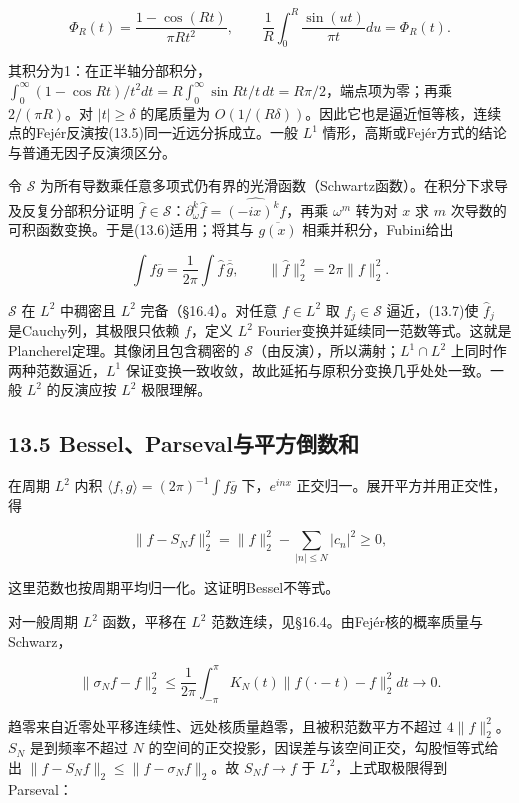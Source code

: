 \documentclass[11pt,a4paper]{article}
\begin{document}
\[
\Phi_R(t)=\frac{1-\cos(Rt)}{\pi R t^2},\qquad
\frac1R\int_0^R\frac{\sin(ut)}{\pi t}du=\Phi_R(t).
\]

其积分为1：在正半轴分部积分，\(\int_0^\infty(1-\cos Rt)/t^2dt=R\int_0^\infty\sin Rt/t\,dt=R\pi/2\)，端点项为零；再乘
\(2/(\pi R)\)。对 \(|t|\ge\delta\) 的尾质量为
\(O(1/(R\delta))\)。因此它也是逼近恒等核，连续点的Fejér反演按(13.5)同一近远分拆成立。一般
\(L^1\) 情形，高斯或Fejér方式的结论与普通无因子反演须区分。

令 \(\mathcal S\)
为所有导数乘任意多项式仍有界的光滑函数（Schwartz函数）。在积分下求导及反复分部积分证明
\(\widehat f\in\mathcal S\)：\(\partial_\omega^k\widehat f=\widehat{(-ix)^kf}\)，再乘
\(\omega^m\) 转为对 \(x\) 求 \(m\)
次导数的可积函数变换。于是(13.6)适用；将其与 \(\overline{g(x)}\)
相乘并积分，Fubini给出

\[
\int f\overline g=\frac1{2\pi}\int\widehat f\,\overline{\widehat g},\qquad
\|\widehat f\|_2^2=2\pi\|f\|_2^2.\tag{13.7}
\]

\(\mathcal S\) 在 \(L^2\) 中稠密且 \(L^2\) 完备（§16.4）。对任意
\(f\in L^2\) 取 \(f_j\in\mathcal S\) 逼近，(13.7)使 \(\widehat f_j\)
是Cauchy列，其极限只依赖 \(f\)，定义 \(L^2\)
Fourier变换并延续同一范数等式。这就是Plancherel定理。其像闭且包含稠密的
\(\mathcal S\)（由反演），所以满射；\(L^1\cap L^2\)
上同时作两种范数逼近，\(L^1\)
保证变换一致收敛，故此延拓与原积分变换几乎处处一致。一般 \(L^2\)
的反演应按 \(L^2\) 极限理解。

\subsection{13.5
Bessel、Parseval与平方倒数和}\label{besselparsevalux4e0eux5e73ux65b9ux5012ux6570ux548c}

在周期 \(L^2\) 内积 \(\langle f,g\rangle=(2\pi)^{-1}\int f\overline g\)
下，\(e^{inx}\) 正交归一。展开平方并用正交性，得

\[
\|f-S_Nf\|_2^2=\|f\|_2^2-\sum_{|n|\le N}|c_n|^2\ge0,
\]

这里范数也按周期平均归一化。这证明Bessel不等式。

对一般周期 \(L^2\) 函数，平移在 \(L^2\)
范数连续，见§16.4。由Fejér核的概率质量与Schwarz，

\[
\|\sigma_Nf-f\|_2^2
\le\frac1{2\pi}\int_{-\pi}^\pi K_N(t)\|f(\cdot-t)-f\|_2^2dt\to0.
\]

趋零来自近零处平移连续性、远处核质量趋零，且被积范数平方不超过
\(4\|f\|_2^2\)。\(S_N\) 是到频率不超过 \(N\)
的空间的正交投影，因误差与该空间正交，勾股恒等式给出
\(\|f-S_Nf\|_2\le\|f-\sigma_Nf\|_2\)。故 \(S_Nf\to f\) 于
\(L^2\)，上式取极限得到Parseval：
\end{document}
